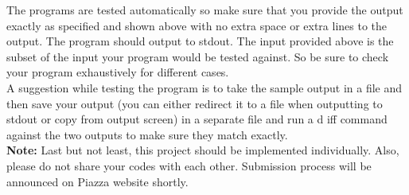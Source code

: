 \documentclass[times, 12pt]{article}
\begin{document}
The programs are tested automatically so make sure that you provide the output exactly as specified and shown above with no extra space or extra lines to the output. The program should output to stdout. The input provided above is the subset of the input your program would be
tested against. So be sure to check your program exhaustively for different cases.\\

A suggestion while testing the program is to take the sample output in a file and then save your output (you can either redirect it to a file when outputting to stdout or copy
from output screen) in a separate file and run a d	iff command against the two outputs to make sure they match exactly.\\

\textbf{Note:} Last but not least, this project should be implemented individually. Also, please do not share your codes with each other. Submission process will be announced on Piazza website shortly.




\end{document}
